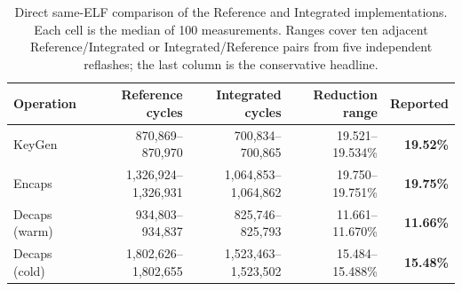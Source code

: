 \begin{table}[t]
\centering
\caption{Direct same-ELF comparison of the Reference and Integrated implementations. Each cell is the median of 100 measurements. Ranges cover ten adjacent Reference/Integrated or Integrated/Reference pairs from five independent reflashes; the last column is the conservative headline.}
\label{tab:final-direct}
\scriptsize
\setlength{\tabcolsep}{2.0pt}
\begin{tabular}{@{}lrrrr@{}}
\toprule
Operation & Reference cycles & Integrated cycles & Reduction range & Reported \\
\midrule
KeyGen & 870,869--870,970 & 700,834--700,865 & 19.521--19.534\% & \textbf{19.52\%} \\
Encaps & 1,326,924--1,326,931 & 1,064,853--1,064,862 & 19.750--19.751\% & \textbf{19.75\%} \\
Decaps (warm) & 934,803--934,837 & 825,746--825,793 & 11.661--11.670\% & \textbf{11.66\%} \\
Decaps (cold) & 1,802,626--1,802,655 & 1,523,463--1,523,502 & 15.484--15.488\% & \textbf{15.48\%} \\
\bottomrule
\end{tabular}
\end{table}
